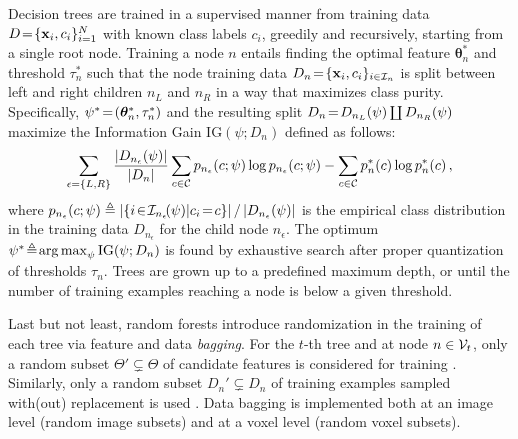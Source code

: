 Decision trees are trained in a supervised manner from training data $D\!=\!\{\boldsymbol{\mathrm{x}}_i,c_i\}_{i=1}^N$ with known 
class labels $c_i$, greedily and recursively, starting from a single root node. Training a node $n$ entails 
finding the optimal feature $\bm{\theta}_n^\ast$ and threshold $\tau_n^\ast$ such that the node training data 
$D_n\!=\!\{\boldsymbol{\mathrm{x}}_i,c_i\}_{i\in\mathcal{I}_n}$ is split between left and right children $n_L$ and $n_R$ in a way that maximizes 
class purity. Specifically, $\psi^\ast\!=\!(\bm{\theta}_n^\ast, \tau_n^\ast)$ and the resulting split 
$D_n\!=\! D_{n_L}(\psi)\coprod D_{n_R}(\psi)$ maximize the Information Gain $\text{IG}(\psi; D_n)$ 
defined as follows:
\begin{equation}
\sum_{\epsilon=\{L,R\}} \frac{\vert D_{n_\epsilon}(\psi)\vert}{\vert D_n\vert}\sum_{c\in\mathcal{C}}p_{n_\epsilon}(c;\psi)\log{p_{n_\epsilon}(c;\psi)} \\ 
 -\sum_{c\in\mathcal{C}}p_{n}^\ast(c)\log{p_{n}^\ast(c)}\, ,
\label{eq: IG maximization}
\end{equation}
where $p_{n_\epsilon}(c;\psi)\triangleq\left\vert\{i\!\in\!\mathcal{I}_{n_\epsilon}\!(\psi)\vert c_i\!=\! c\}\right\vert/\left\vert D_{n_\epsilon}(\psi)\right\vert$ is the empirical class distribution in the training data $D_{n_\epsilon}$ for the child node $n_\epsilon$. The optimum $\psi^\ast\!\triangleq\! \operatorname*{arg\,max}_{\psi}\text{IG}(\psi; D_n)$ is found by exhaustive search after proper quantization of thresholds $\tau_n$. Trees are grown up to a predefined 
maximum depth, or until the number of training examples reaching a node is below a given threshold.

Last but not least, random forests introduce randomization in the training of each tree via feature and data \textit{bagging}. For the $t$-th tree and at node $n\in\mathcal{V}_t$, only a random subset $\Theta' \!\varsubsetneq\! \Theta$ of candidate features is considered for training \cite{amit1997shape,ho1998random}. %
Similarly, only a random subset $D_n'\!\varsubsetneq\!D_n$ of training examples sampled with(out) replacement is used \cite{breiman1996bagging}. %
Data bagging is implemented both at an image level (random image subsets) and at a voxel level (random voxel subsets). 

